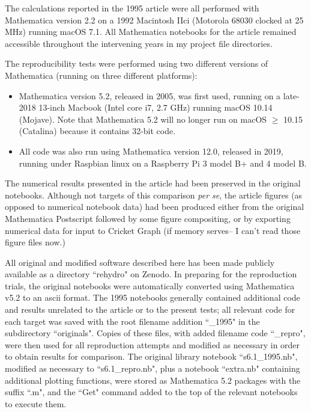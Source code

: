 The calculations reported in the 1995 article were all performed with Mathematica version 2.2 on a 1992 Macintosh IIci (Motorola 68030 clocked at 25 MHz) running macOS 7.1. All Mathematica notebooks for the article remained accessible throughout the intervening years in my project file directories.

 The reproducibility tests were performed using two different versions of Mathematica (running on three different platforms):

\begin{itemize}

\item Mathematica version 5.2, released in 2005, was first used, running on a late-2018 13-inch Macbook (Intel core i7, 2.7 GHz) running macOS 10.14 (Mojave). Note that Mathematica 5.2 will no longer run on macOS $\ge$ 10.15 (Catalina) because it contains 32-bit code.

\item All code was also run using Mathematica version 12.0, released in 2019, running under Raspbian linux on a Raspberry Pi 3 model B+ and 4 model B.

\end{itemize}

The numerical results presented in the article had been preserved in the original notebooks. Although not targets of this comparison \textit{per se}, the article figures (as opposed to numerical notebook data) had been produced either from the original Mathematica Postscript followed by some figure compositing, or by exporting numerical data for input to Cricket Graph (if memory serves-- I can't read those figure files now.)

All original and modified software described here has been made publicly available as a directory ``rehydro" on Zenodo. In preparing for the reproduction trials, the original notebooks were automatically converted using Mathematica v5.2 to an ascii format. The 1995 notebooks generally contained additional code and results unrelated to the article or to the present tests; all relevant code for each target was saved with the root filename addition ``\_1995" in the subdirectory ``originals". Copies of these files, with added filename code ``\_repro", were then used for all reproduction attempts and modified as necessary in order to obtain results for comparison. The original library notebook ``s6.1\_1995.nb", modified as necessary to ``s6.1\_repro.nb", plus a notebook ``extra.nb" containing additional plotting functions, were stored as Mathematica 5.2 packages with the suffix ``.m", and the ``Get" command added to the top of the relevant notebooks to execute them.

